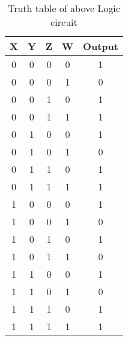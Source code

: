 \documentclass{article}
\begin{document}
\begin{table} [h!]
    \centering
    \begin{tabular}{ | c | c | c | c | c | }
    \hline
    X & Y & Z & W & Output \\
    \hline
    0 & 0 & 0 & 0 &  1\\
    0 & 0 & 0 & 1 &  0\\
    0 & 0 & 1 & 0 &  1\\
    0 & 0 & 1 & 1 &  1\\
    0 & 1 & 0 & 0 &  1\\
    0 & 1 & 0 & 1 &  0\\
    0 & 1 & 1 & 0 &  1\\
    0 & 1 & 1 & 1 &  1\\
    1 & 0 & 0 & 0 &  1\\
    1 & 0 & 0 & 1 &  0\\
    1 & 0 & 1 & 0 &  1\\
    1 & 0 & 1 & 1 &  0\\
    1 & 1 & 0 & 0 &  1\\
    1 & 1 & 0 & 1 &  0\\
    1 & 1 & 1 & 0 &  1\\
    1 & 1 & 1 & 1 &  1\\
     \hline
\end{tabular}
\caption{Truth table of above Logic circuit}
\label{Table1}
\end{table}
\end{document}
